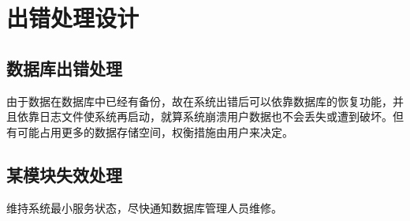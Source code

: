 \chapter{出错处理设计}
\section{数据库出错处理}
由于数据在数据库中已经有备份，故在系统出错后可以依靠数据库的恢复功能，并且依靠日志文件使系统再启动，就算系统崩溃用户数据也不会丢失或遭到破坏。但有可能占用更多的数据存储空间，权衡措施由用户来决定。

\section{某模块失效处理}
维持系统最小服务状态，尽快通知数据库管理人员维修。
